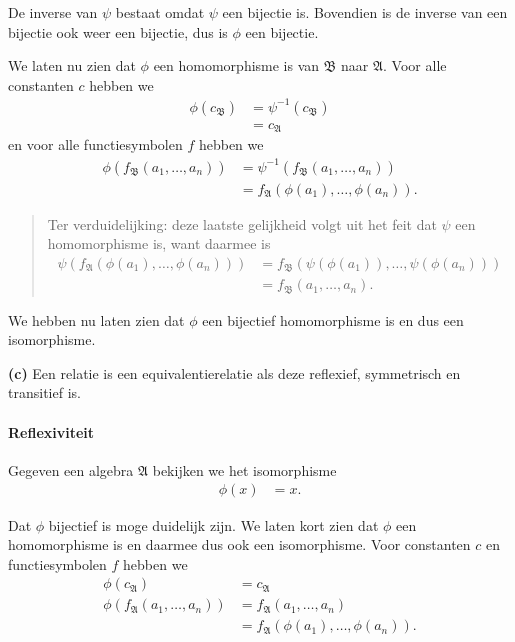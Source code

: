\documentclass[a4paper,11pt]{article}
\begin{document}
\begin{description}
De inverse van $\psi$ bestaat omdat $\psi$ een bijectie is. Bovendien is de
inverse van een bijectie ook weer een bijectie, dus is $\phi$ een bijectie.

We laten nu zien dat $\phi$ een homomorphisme is van $\mathfrak{B}$ naar
$\mathfrak{A}$. Voor alle constanten $c$ hebben we
\begin{align*}
\phi(c_{\mathfrak{B}}) &= \psi^{-1}(c_{\mathfrak{B}}) \\
                       &= c_{\mathfrak{A}}
\end{align*}
en voor alle functiesymbolen $f$ hebben we
\begin{align*}
\phi(f_{\mathfrak{B}}(a_{1}, \ldots, a_{n})) &= \psi^{-1}(f_{\mathfrak{B}}(a_{1}, \ldots, a_{n})) \\
                                             &=
                                             f_{\mathfrak{A}}(\phi(a_{1}),
                                             \ldots, \phi(a_{n})).
\end{align*}
\begin{quote}
Ter verduidelijking: deze laatste gelijkheid volgt uit het feit dat $\psi$ een
homomorphisme is, want daarmee is
\begin{align*}
\psi(f_{\mathfrak{A}}(\phi(a_{1}), \ldots, \phi(a_{n}))) &= f_{\mathfrak{B}}(\psi(\phi(a_{1})), \ldots, \psi(\phi(a_{n}))) \\
                                                         &= f_{\mathfrak{B}}(a_{1}, \ldots, a_{n}).
\end{align*}
\end{quote}

We hebben nu laten zien dat $\phi$ een bijectief homomorphisme is en dus een isomorphisme.

\item{\bf (c)} %
Een relatie is een equivalentierelatie als deze reflexief, symmetrisch en
transitief is.

\paragraph{Reflexiviteit}

Gegeven een algebra $\mathfrak{A}$ bekijken we het isomorphisme
\begin{align*}
\phi(x) &= x.
\end{align*}

Dat $\phi$ bijectief is moge duidelijk zijn. We laten kort zien dat $\phi$ een
homomorphisme is en daarmee dus ook een isomorphisme. Voor constanten $c$ en
functiesymbolen $f$ hebben we
\begin{align*}
\phi(c_{\mathfrak{A}})                       &= c_{\mathfrak{A}} \\
\phi(f_{\mathfrak{A}}(a_{1}, \ldots, a_{n})) &= f_{\mathfrak{A}}(a_{1}, \ldots, a_{n}) \\
                                             &= f_{\mathfrak{A}}(\phi(a_{1}), \ldots, \phi(a_{n})).
\end{align*}


\end{description}
\end{document}

